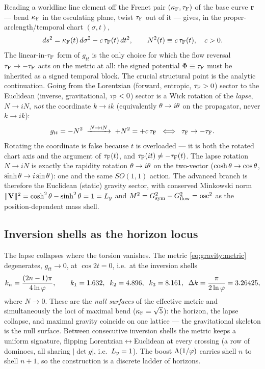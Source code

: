 Reading a worldline line element off the Frenet pair $(\kappa_{\mathrm{F}},\tau_{\mathrm{F}})$ of the base curve $\mathbf{r}$ — bend $\kappa_{\mathrm{F}}$ in the osculating plane, twist $\tau_{\mathrm{F}}$ out of it — gives, in the proper-arclength/temporal chart $(\sigma,t)$,
\begin{equation}
ds^2 = \kappa_{\mathrm{F}}(t)\,d\sigma^2 - c\,\tau_{\mathrm{F}}(t)\,dt^2 ,
\qquad N^2(t)\equiv c\,\tau_{\mathrm{F}}(t),\quad c>0 .
\label{eq:gravity:metric}
\end{equation}
The linear-in-$\tau_{\mathrm{F}}$ form of $g_{tt}$ is the only choice for which the flow reversal $\tau_{\mathrm{F}}\to-\tau_{\mathrm{F}}$ acts on the metric at all: the signed potential $\Phi\equiv\tau_{\mathrm{F}}$ must be inherited as a signed temporal block. The crucial structural point is the analytic continuation. Going from the Lorentzian (forward, entropic, $\tau_{\mathrm{F}}>0$) sector to the Euclidean (inverse, gravitational, $\tau_{\mathrm{F}}<0$) sector is a Wick rotation of the \emph{lapse}, $N\to iN$, \emph{not} the coordinate $k\to ik$ (equivalently $\theta\to i\theta$ on the propagator, never $k\to ik$):
\begin{equation}
g_{tt}=-N^2 \;\xrightarrow{\,N\to iN\,}\; +N^2=+c\,\tau_{\mathrm{F}}
\;\;\Longleftrightarrow\;\; \tau_{\mathrm{F}}\to-\tau_{\mathrm{F}} .
\label{eq:gravity:wick}
\end{equation}
Rotating the coordinate is false because $t$ is overloaded — it is both the rotated chart axis and the argument of $\tau_{\mathrm{F}}(t)$, and $\tau_{\mathrm{F}}(it)\neq-\tau_{\mathrm{F}}(t)$. The lapse rotation $N\to iN$ is exactly the rapidity rotation $\theta\to i\theta$ on the two-vector ($\cosh\theta\to\cos\theta$, $\sinh\theta\to i\sin\theta$): one and the same $SO(1,1)$ action. The advanced branch is therefore the Euclidean (static) gravity sector, with conserved Minkowski norm $\|\mathbf{V}\|^2=\cosh^2\theta-\sinh^2\theta=1=L_{y}$ and $M^2=G_{\mathrm{sym}}^2-G_{\mathrm{flow}}^2=\operatorname{osc}^2$ as the position-dependent mass shell.

\subsection{Inversion shells as the horizon locus}

The lapse collapses where the torsion vanishes. The metric \eqref{eq:gravity:metric} degenerates, $g_{tt}\to 0$, at $\cos 2t=0$, i.e.\ at the inversion shells
\begin{equation}
k_n=\frac{(2n-1)\pi}{4\ln\varphi},
\qquad k_1=1.632,\;\; k_2=4.896,\;\; k_3=8.161,\;\; \Delta k=\frac{\pi}{2\ln\varphi}=3.26425 ,
\label{eq:gravity:shells}
\end{equation}
where $N\to 0$. These are the \emph{null surfaces} of the effective metric and simultaneously the loci of maximal bend ($\kappa_{\mathrm{F}}=\sqrt5$): the horizon, the lapse collapse, and maximal gravity coincide on one lattice — the gravitational skeleton is the null surface. Between consecutive inversion shells the metric keeps a uniform signature, flipping Lorentzian$\leftrightarrow$Euclidean at every crossing (a row of dominoes, all sharing $|\det g|$, i.e.\ $L_{y}=1$). The boost $\Lambda(1/\varphi)$ carries shell $n$ to shell $n+1$, so the construction is a discrete ladder of horizons.

